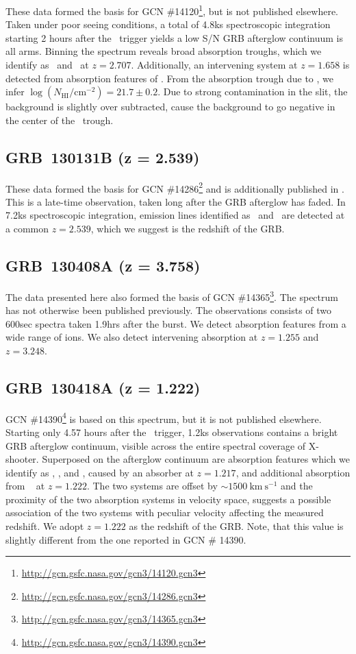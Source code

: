 \documentclass{aa}    %
\begin{document}
These data formed the basis for GCN
\#14120\footnote{\url{http://gcn.gsfc.nasa.gov/gcn3/14120.gcn3}}, but is not
published elsewhere. Taken under poor seeing conditions, a total of 4.8ks
spectroscopic integration starting 2 hours after the \swift~trigger yields a low
S/N GRB afterglow continuum is all arms. Binning the spectrum reveals broad
absorption troughs, which we identify as \lyb~and \lya~at $z = 2.707$.
Additionally, an intervening system at $z = 1.658$ is detected from absorption
features of \mgii. From the absorption trough due to \lya, we infer $\log
(N_{\mathrm{HI}}/\mathrm{cm}^{-2}) = 21.7 \pm 0.2$. Due to strong contamination
in the slit, the background is slightly over subtracted, cause the background to
go negative in the center of the \lya~trough.

\subsection{GRB~130131B (z = 2.539)}

These data formed the basis for GCN
\#14286\footnote{\url{http://gcn.gsfc.nasa.gov/gcn3/14286.gcn3}} and is
additionally published in \citet{Kruhler2015}. This is a late-time observation,
taken long after the GRB afterglow has faded. In 7.2ks spectroscopic
integration, emission lines identified as \oii~and \oiii~are detected at a
common $z = 2.539$, which we suggest is the redshift of the GRB.

\subsection{GRB~130408A (z = 3.758)}

The data presented here also formed the basis of GCN
\#14365\footnote{\url{http://gcn.gsfc.nasa.gov/gcn3/14365.gcn3}}. The spectrum
has not otherwise been published previously. The observations consists of two
600sec spectra taken 1.9hrs after the burst. We detect absorption features from
a wide range of ions. We also detect intervening absorption at $z=1.255$ and
$z=3.248$.

\subsection{GRB~130418A (z = 1.222)}

GCN \#14390\footnote{\url{http://gcn.gsfc.nasa.gov/gcn3/14390.gcn3}} is based on
this spectrum, but it is not published elsewhere. Starting only 4.57 hours after
the \swift~trigger, 1.2ks observations contains a bright GRB afterglow
continuum, visible across the entire spectral coverage of X-shooter. Superposed
on the afterglow continuum are absorption features which we identify as \civ,
\feii, and \mgii, caused by an absorber at $z = 1.217$, and additional
absorption from \civ~ at $z = 1.222$. The two systems are offset by $\sim
1500~\mathrm{km}~\mathrm{s}^{-1}$ and the proximity of the two absorption
systems in velocity space, suggests a possible association of the two systems
with peculiar velocity affecting the measured redshift. We adopt $z = 1.222$ as
the redshift of the GRB. Note, that this value is slightly different from the
one reported in GCN \# 14390.
\end{document}
